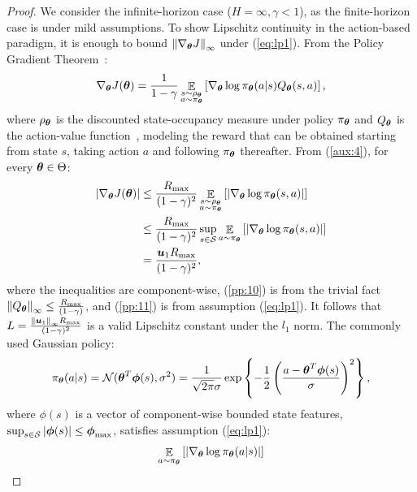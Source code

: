 \documentclass{article}
\begin{document}
\lipschitzpol*
\begin{proof}
	We consider the infinite-horizon case ($H=\infty,\gamma<1$), as the finite-horizon case is \wlg under mild assumptions.
	To show Lipschitz continuity in the action-based paradigm, it is enough to bound $\norm[\infty]{\nabla_{\vtheta}J}$ under (\ref{eq:lp1}). From the Policy Gradient Theorem~\cite{sutton2000policy}:
	\begin{align}\label{aux:4}
		\nabla_{\vtheta}J(\vtheta) = \frac{1}{1-\gamma}\Exp_{\substack{s\sim \rho_{\vtheta}
		\\a\sim\pi_{\vtheta}}}\left[\nabla_{\vtheta}\log\pi_{\vtheta}(a|s)Q_{\vtheta}(s,a)\right],
	\end{align}
	where $\rho_{\vtheta}$ is the discounted state-occupancy measure under policy $\pi_{\vtheta}$ and $Q_{\vtheta}$ is the action-value function~\cite{sutton2000policy}, modeling the reward that can be obtained starting from state $s$, taking action $a$ and following $\pi_{\vtheta}$ thereafter.
	From (\ref{aux:4}), for every $\vtheta\in\Theta$:
	\begin{align}
		|\nabla_{\vtheta}J(\vtheta)| 
		&\leq \frac{\Rmax}{(1-\gamma)^2}\Exp_{\substack{s\sim \rho_{\vtheta}\\a\sim\pi_{\vtheta}}}\left[|\nabla_{\vtheta}\log\pi_{\vtheta}(s,a)|\right] \label{pp:10}\\
		&\leq \frac{\Rmax}{(1-\gamma)^2}\sup_{s\in\Sspace}\Exp_{a\sim\pi_{\vtheta}}\left[|\nabla_{\vtheta}\log\pi_{\vtheta}(s,a)|\right] \nonumber\\
		& = \frac{\vu_1\Rmax}{(1-\gamma)^2}, \label{pp:11}
	\end{align}
	where the inequalities are component-wise, (\ref{pp:10}) is from the trivial fact $\norm[\infty]{Q_{\vtheta}}\leq\frac{\Rmax}{(1-\gamma)}$, and (\ref{pp:11}) is from assumption (\ref{eq:lp1}). It follows that $L=\frac{\norm[\infty]{\vu_1}\Rmax}{(1-\gamma)^2}$ is a valid Lipschitz constant under the $l_1$ norm.
	The commonly used Gaussian policy:
	\begin{align}\label{eq:gauss}
		\pi_{\vtheta}(a|s) = \mathcal{N}(\vtheta^T\vphi(s),\sigma^2)  = \frac{1}{\sqrt{2\pi}\sigma}\exp\left\{-\frac{1}{2}\left(\frac{a-\vtheta^T\vphi(s)}{\sigma}\right)^2\right\},
	\end{align}
	where $\phi(s)$ is a vector of component-wise bounded state features, \ie $\sup_{s\in\Sspace}|\vphi(s)|\leq \vphi_{\max}$, satisfies assumption (\ref{eq:lp1}):
	\begin{align}
		\Exp_{a\sim\pi_{\vtheta}}\left[\left|\nabla_{\vtheta}\log\pi_{\vtheta}(a|s)\right|\right] 

\end{align}
\end{proof}
\end{document}
